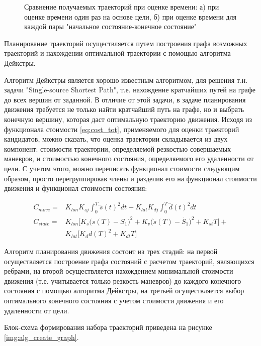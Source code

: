 \begin{figure}[h!]
\begin{minipage}[h]{0.49\linewidth}
      \end{minipage}
      \caption{Сравнение получаемых траекторий при оценке времени: а) при оценке времени один раз на основе цели,
      б) при оценке времени для каждой пары "начальное состояние-конечное состояние"}
      \label{img:t_estimate_compare}
\end{figure}

Планирование траекторий осуществляется путем построения графа возможных траекторий и нахождении оптимальной траектории
с помощью алгоритма Дейкстры.

Алгоритм Дейкстры является хорошо известным алгоритмом, для решения т.н. задачи "Single-source Shortest Path", т.е.
нахождение кратчайших путей на графе до всех вершин от заданной. В отличие от этой задачи, в задаче планирования
движения требуется не только найти кратчайший путь на графе, но и выбрать конечную вершину, которая даст оптимальную
траекторию движения. Исходя из функционала стоимости \ref{eq:cost_tot}, применяемого для оценки траекторий кандидатов,
можно сказать, что оценка траектории складывается из двух компонент: стоимости траектории, определяемой резкостью
совершаемых маневров, и стоимостью конечного состояния, определяемого его удаленности от цели. С учетом этого, можно
переписать функционал стоимости следующим образом, просто перегруппировав члены и разделив его на функционал стоимости
движения и функционал стоимости
состояния:

\begin{align}
      C_{move}  = &K_{lon}K_{sj}\int_{0}^{T}{\dddot{s}(t)^2dt} + K_{lat}K_{dj}\int_{0}^{T}{\dddot{d}(t)^2dt} \\
      C_{state} = &K_{lon}\Big[K_s \big(s(T) - S_1\big)^2 + K_v \big(\dot{s}(T) - \dot{S_1}\big)^2 + K_{st} T\Big] + \\
                  &K_{lat}\Big[K_d d(T)^2 + K_{dt} T\Big] \nonumber
\end{align}

Алгоритм планирования движения состоит из трех стадий: на первой осуществляется построение графа
состояний с расчетом траекторий, являющихся ребрами, на второй осуществляется нахождением минимальной стоимости движения
(т.е. учитывается только резкость маневров) до каждого конечного состояния с помощью алгоритма Дейкстры, на третьей
осуществляется выбор оптимального конечного состояния с учетом стоимости движения и его удаленности от цели.

Блок-схема формирования набора траекторий приведена на рисунке \ref{img:alg_create_graph}.

